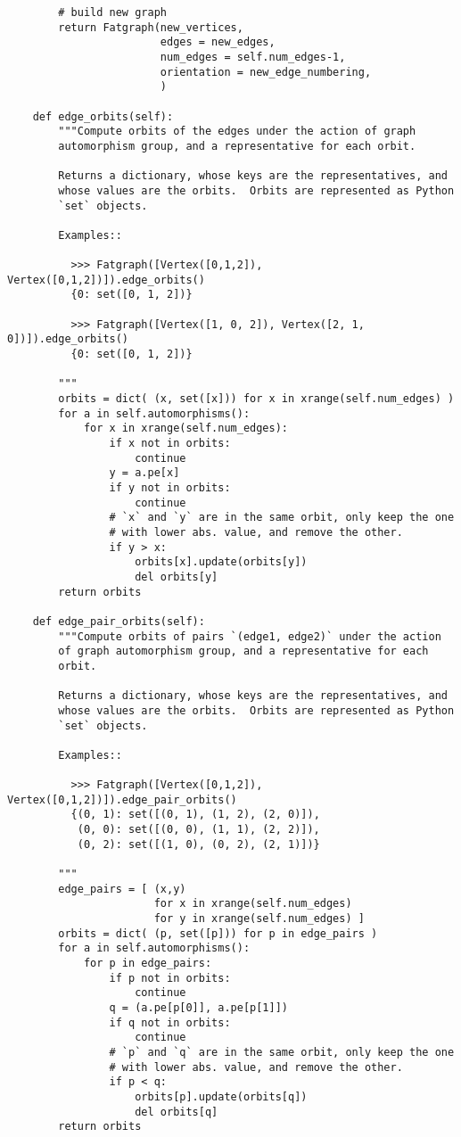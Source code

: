 \begin{lstlisting}
        # build new graph
        return Fatgraph(new_vertices,
                        edges = new_edges,
                        num_edges = self.num_edges-1,
                        orientation = new_edge_numbering,
                        )

    def edge_orbits(self):
        """Compute orbits of the edges under the action of graph
        automorphism group, and a representative for each orbit.
        
        Returns a dictionary, whose keys are the representatives, and
        whose values are the orbits.  Orbits are represented as Python
        `set` objects.

        Examples::

          >>> Fatgraph([Vertex([0,1,2]), Vertex([0,1,2])]).edge_orbits()
          {0: set([0, 1, 2])}

          >>> Fatgraph([Vertex([1, 0, 2]), Vertex([2, 1, 0])]).edge_orbits()
          {0: set([0, 1, 2])}
          
        """
        orbits = dict( (x, set([x])) for x in xrange(self.num_edges) )
        for a in self.automorphisms():
            for x in xrange(self.num_edges):
                if x not in orbits:
                    continue
                y = a.pe[x]
                if y not in orbits:
                    continue
                # `x` and `y` are in the same orbit, only keep the one
                # with lower abs. value, and remove the other.
                if y > x:
                    orbits[x].update(orbits[y])
                    del orbits[y]
        return orbits

    def edge_pair_orbits(self):
        """Compute orbits of pairs `(edge1, edge2)` under the action
        of graph automorphism group, and a representative for each
        orbit.
        
        Returns a dictionary, whose keys are the representatives, and
        whose values are the orbits.  Orbits are represented as Python
        `set` objects.

        Examples::

          >>> Fatgraph([Vertex([0,1,2]), Vertex([0,1,2])]).edge_pair_orbits()
          {(0, 1): set([(0, 1), (1, 2), (2, 0)]),
           (0, 0): set([(0, 0), (1, 1), (2, 2)]),
           (0, 2): set([(1, 0), (0, 2), (2, 1)])}
          
        """
        edge_pairs = [ (x,y) 
                       for x in xrange(self.num_edges)
                       for y in xrange(self.num_edges) ]
        orbits = dict( (p, set([p])) for p in edge_pairs )
        for a in self.automorphisms():
            for p in edge_pairs:
                if p not in orbits:
                    continue
                q = (a.pe[p[0]], a.pe[p[1]])
                if q not in orbits:
                    continue
                # `p` and `q` are in the same orbit, only keep the one
                # with lower abs. value, and remove the other.
                if p < q:
                    orbits[p].update(orbits[q])
                    del orbits[q]
        return orbits



\end{lstlisting}

